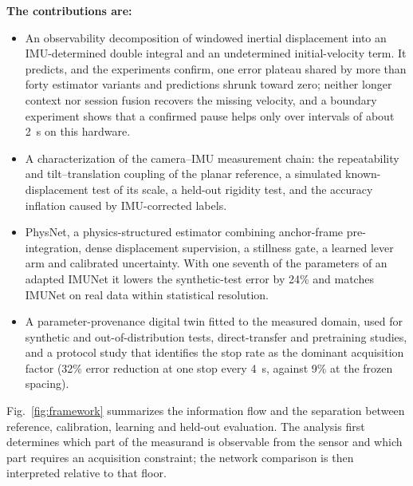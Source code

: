 \textbf{The contributions are:}
\begin{itemize}
  \item An observability decomposition of windowed inertial displacement into
  an IMU-determined double integral and an undetermined initial-velocity term.
  It predicts, and the experiments confirm, one error plateau shared by more
  than forty estimator variants and predictions shrunk toward zero; neither
  longer context nor session fusion recovers the missing velocity, and a
  boundary experiment shows that a confirmed pause helps only over intervals
  of about 2~s on this hardware.
  \item A characterization of the camera--IMU measurement chain: the
  repeatability and tilt--translation coupling of the planar reference, a
  simulated known-displacement test of its scale, a held-out rigidity test,
  and the accuracy inflation caused by IMU-corrected labels.
  \item PhysNet, a physics-structured estimator combining anchor-frame
  pre-integration, dense displacement supervision, a stillness gate, a learned
  lever arm and calibrated uncertainty. With one seventh of the parameters of
  an adapted IMUNet it lowers the synthetic-test error by 24\% and matches
  IMUNet on real data within statistical resolution.
  \item A parameter-provenance digital twin fitted to the measured domain,
  used for synthetic and out-of-distribution tests, direct-transfer and
  pretraining studies, and a protocol study that identifies the stop rate as
  the dominant acquisition factor (32\% error reduction at one stop every
  4~s, against 9\% at the frozen spacing).
\end{itemize}

Fig.~\ref{fig:framework} summarizes the information flow and the separation
between reference, calibration, learning and held-out evaluation. The analysis
first determines which part of the measurand is observable from the sensor and
which part requires an acquisition constraint; the network comparison is then
interpreted relative to that floor.
